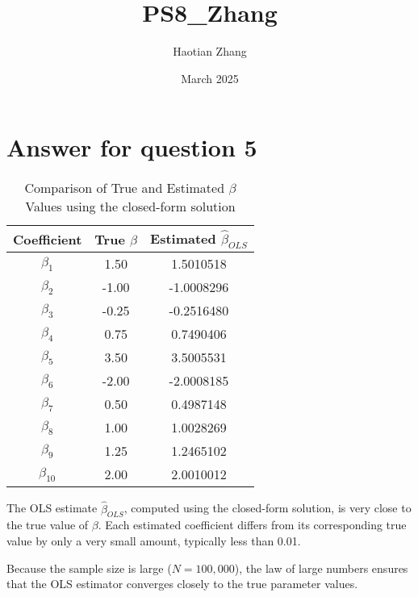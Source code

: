 \documentclass{article}
\title{PS8\_Zhang}
\author{Haotian Zhang}
\date{March 2025}
\begin{document}
\maketitle

\section{Answer for question 5}
\begin{table}[H]
\centering
\caption{Comparison of True and Estimated $\beta$ Values using the closed-form solution}
\begin{tabular}{|c|c|c|}
\hline
\textbf{Coefficient} & \textbf{True $\beta$} & \textbf{Estimated $\hat{\beta}_{OLS}$} \\
\hline
$\beta_1$ & 1.50  & 1.5010518 \\
$\beta_2$ & -1.00 & -1.0008296 \\
$\beta_3$ & -0.25 & -0.2516480 \\
$\beta_4$ & 0.75  & 0.7490406 \\
$\beta_5$ & 3.50  & 3.5005531 \\
$\beta_6$ & -2.00 & -2.0008185 \\
$\beta_7$ & 0.50  & 0.4987148 \\
$\beta_8$ & 1.00  & 1.0028269 \\
$\beta_9$ & 1.25  & 1.2465102 \\
$\beta_{10}$ & 2.00 & 2.0010012 \\
\hline
\end{tabular}
\end{table}

The OLS estimate $\hat{\beta}_{OLS}$, computed using the closed-form solution, is very close to the true value of $\beta$. Each estimated coefficient differs from its corresponding true value by only a very small amount, typically less than 0.01.

Because the sample size is large ($N = 100{,}000$), the law of large numbers ensures that the OLS estimator converges closely to the true parameter values.
\end{document}
